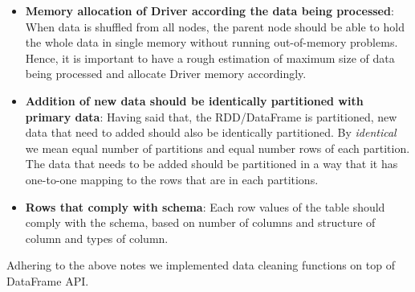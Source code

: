 \begin{itemize}
\item \textbf{Memory allocation of Driver according the data being processed}: When data is shuffled from all nodes, the parent node should be able to hold the whole data in single memory without running out-of-memory problems. Hence, it is important to have a rough estimation of maximum size of data being processed and allocate Driver memory accordingly. 
\item \textbf{Addition of new data should be identically partitioned with primary data}:  Having said that, the RDD/DataFrame is partitioned, new data that need to added should also be identically partitioned. By \textit{identical} we mean equal number of partitions and equal number rows of each partition. The data that needs to be added should be partitioned in a way that it has one-to-one mapping to the rows that are in each partitions. 
\item \textbf{Rows that comply with schema}: Each row values of the table should comply with the schema, based on number of columns and structure of column and types of column.
\end{itemize}
Adhering to the above notes we implemented data cleaning functions on top of DataFrame API. 
